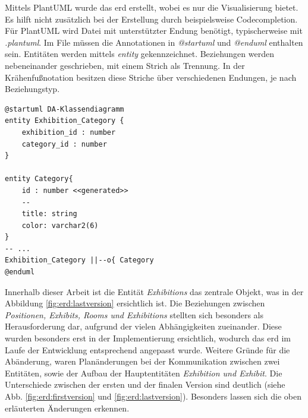 Mittels PlantUML wurde das \gls{erd} erstellt, wobei es nur die Visualisierung bietet. 
Es hilft nicht zusätzlich bei der Erstellung durch beispielsweise Codecompletion.
Für PlantUML wird Datei mit unterstützter Endung benötigt, typischerweise mit \emph{.plantuml}. 
Im File müssen die Annotationen in \emph{@startuml} und \emph{@enduml} enthalten sein.
Entitäten werden mittels \emph{entity} gekennzeichnet. 
Beziehungen werden nebeneinander geschrieben, mit einem Strich als Trennung. 
In der Krähenfußnotation besitzen diese Striche über verschiedenen Endungen, je nach Beziehungstyp. 

\begin{lstlisting}[label=lst:erdplantujml, caption=Ausschnitt der ERD-Datei]
@startuml DA-Klassendiagramm
entity Exhibition_Category {
    exhibition_id : number
    category_id : number
}

entity Category{
    id : number <<generated>>
    --
    title: string
    color: varchar2(6)
}
-- ...
Exhibition_Category ||--o{ Category
@enduml
\end{lstlisting}

Innerhalb dieser Arbeit ist die Entität \emph{Exhibitions} das zentrale Objekt, was in der Abbildung \ref{fig:erd:lastversion} ersichtlich ist.
Die Beziehungen zwischen \emph{Positionen, Exhibits, Rooms und Exhibitions} stellten sich besonders als Herausforderung dar, aufgrund der vielen Abhängigkeiten zueinander. 
Diese wurden besonders erst in der Implementierung ersichtlich, wodurch das \gls{erd} im Laufe der Entwicklung entsprechend angepasst wurde. 
Weitere Gründe für die Abänderung, waren Planänderungen bei der Kommunikation zwischen zwei Entitäten, sowie der Aufbau der Hauptentitäten \emph{Exhibition und Exhibit}. 
Die Unterschiede zwischen der ersten und der finalen Version sind deutlich (siehe Abb. \ref{fig:erd:firstversion} und \ref{fig:erd:lastversion}).
Besonders lassen sich die oben erläuterten Änderungen erkennen. 
 

